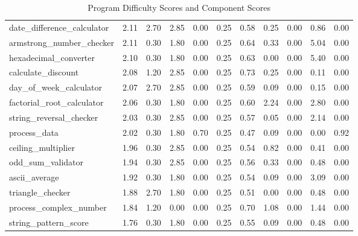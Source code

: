 \begin{table}[h]
\begin{adjustbox}{max width=\textwidth}
\begin{tabular}{lrrrrrrrrrr}
date\_difference\_calculator & 2.11 & 2.70 & 2.85 & 0.00 & 0.25 & 0.58 & 0.25 & 0.00 & 0.86 & 0.00 \\
armstrong\_number\_checker & 2.11 & 0.30 & 1.80 & 0.00 & 0.25 & 0.64 & 0.33 & 0.00 & 5.04 & 0.00 \\
hexadecimal\_converter & 2.10 & 0.30 & 1.80 & 0.00 & 0.25 & 0.63 & 0.00 & 0.00 & 5.40 & 0.00 \\
calculate\_discount & 2.08 & 1.20 & 2.85 & 0.00 & 0.25 & 0.73 & 0.25 & 0.00 & 0.11 & 0.00 \\
day\_of\_week\_calculator & 2.07 & 2.70 & 2.85 & 0.00 & 0.25 & 0.59 & 0.09 & 0.00 & 0.15 & 0.00 \\
factorial\_root\_calculator & 2.06 & 0.30 & 1.80 & 0.00 & 0.25 & 0.60 & 2.24 & 0.00 & 2.80 & 0.00 \\
string\_reversal\_checker & 2.03 & 0.30 & 2.85 & 0.00 & 0.25 & 0.57 & 0.05 & 0.00 & 2.14 & 0.00 \\
process\_data & 2.02 & 0.30 & 1.80 & 0.70 & 0.25 & 0.47 & 0.09 & 0.00 & 0.00 & 0.92 \\
ceiling\_multiplier & 1.96 & 0.30 & 2.85 & 0.00 & 0.25 & 0.54 & 0.82 & 0.00 & 0.41 & 0.00 \\
odd\_sum\_validator & 1.94 & 0.30 & 2.85 & 0.00 & 0.25 & 0.56 & 0.33 & 0.00 & 0.48 & 0.00 \\
ascii\_average & 1.92 & 0.30 & 1.80 & 0.00 & 0.25 & 0.54 & 0.09 & 0.00 & 3.09 & 0.00 \\
triangle\_checker & 1.88 & 2.70 & 1.80 & 0.00 & 0.25 & 0.51 & 0.00 & 0.00 & 0.48 & 0.00 \\
process\_complex\_number & 1.84 & 1.20 & 0.00 & 0.00 & 0.25 & 0.70 & 1.08 & 0.00 & 1.44 & 0.00 \\
string\_pattern\_score & 1.76 & 0.30 & 1.80 & 0.00 & 0.25 & 0.55 & 0.09 & 0.00 & 0.48 & 0.00 \\
\bottomrule
\end{tabular}
\end{adjustbox}
\caption{Program Difficulty Scores and Component Scores}
\label{tab:program_difficulty}
\end{table}